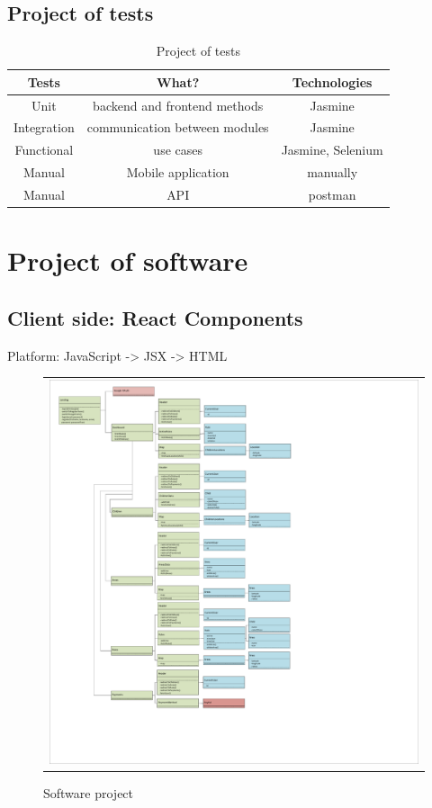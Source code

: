 \documentclass{sprawozdanie-agh}
\begin{document}
		\subsection{Project of tests}
		
		\begin{table}[H]
			\centering
			\begin{tabular}{|c|c|c|}
				\hline
				\textbf{Tests} & \textbf{What?} & \textbf{Technologies} \\
				\hline
				Unit & backend and frontend methods & Jasmine \\ \hline
				Integration & communication between modules & Jasmine \\ \hline
				Functional & use cases & Jasmine, Selenium \\ \hline
				Manual & Mobile application & manually \\ \hline
				Manual & API & postman \\ \hline
			\end{tabular}
			\caption{Project of tests} 
		\end{table}

	\section{Project of software}

		\subsection{Client side: React Components}

			Platform: JavaScript -> JSX -> HTML

			\begin{figure}[H] 
				\centering
				\begin{tabular}{c}
					\includegraphics[width=.95\textwidth]{ProjektOprogramowania}
				\end{tabular} 
				\caption{Software project}
			\end{figure}
		
\end{document}
